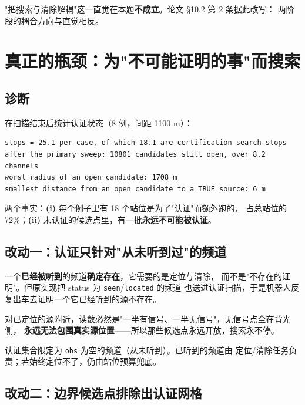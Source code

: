 \begin{warnbox}[title=结论]
"把搜索与清除解耦"这一直觉在本题\textbf{不成立}。论文 §10.2 第 2 条据此改写：
两阶段的耦合方向与直觉相反。
\end{warnbox}

\section{真正的瓶颈：为"不可能证明的事"而搜索}

\subsection{诊断}

在扫描结束后统计认证状态（8 例，间距 1100 m）：

\begin{lstlisting}[caption={扫描结束时的认证缺口（cert\_gap.py）}]
stops = 25.1 per case, of which 18.1 are certification search stops
after the primary sweep: 10801 candidates still open, over 8.2 channels
worst radius of an open candidate: 1708 m
smallest distance from an open candidate to a TRUE source: 6 m
\end{lstlisting}

两个事实：\textbf{(i)} 每个例子里有 18 个站位是为了"认证"而额外跑的，
占总站位的 72\%；\textbf{(ii)} 未认证的候选点里，有一批\textbf{永远不可能被认证}。

\subsection{改动一：认证只针对"从未听到过"的频道}

一个\textbf{已经被听到}的频道\textbf{确定存在}，它需要的是定位与清除，
而不是"不存在的证明"。但原实现把 status 为 \texttt{seen}/\texttt{located} 的频道
也送进认证扫描，于是机器人反复出车去证明一个它已经听到的源不存在。

对已定位的源附近，读数必然是"一半有信号、一半无信号"，无信号点全在背光侧，
\textbf{永远无法包围真实源位置}——所以那些候选点永远开放，搜索永不停。

\begin{keybox}[title=改动]
认证集合限定为 \texttt{obs} 为空的频道（从未听到）。已听到的频道由
定位/清除任务负责；若始终定位不了，仍由站位预算兜底。
\end{keybox}

\subsection{改动二：边界候选点排除出认证网格}

